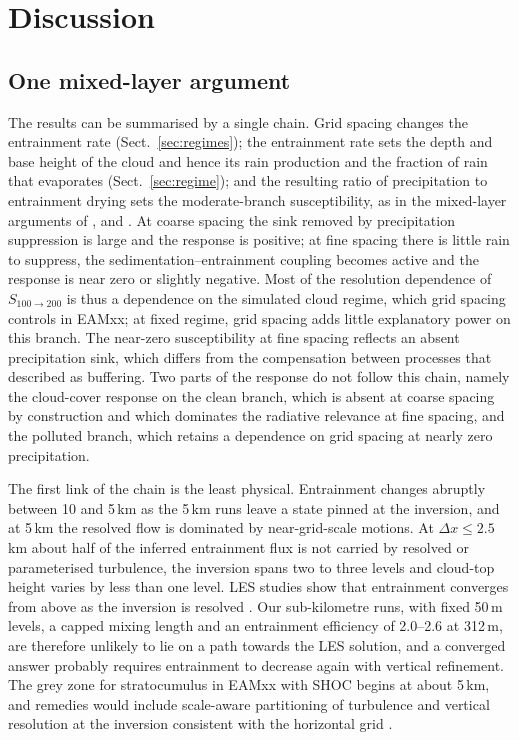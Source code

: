 \documentclass[acp, manuscript]{copernicus}
\newcommand{\dx}{\Delta x}
\newcommand{\Shigh}{S_{100\rightarrow200}}
\begin{document}
\section{Discussion}\label{sec:discussion}

\subsection{One mixed-layer argument}

The results can be summarised by a single chain. Grid spacing changes the entrainment rate (Sect.~\ref{sec:regimes}); the entrainment rate sets the depth and base height of the cloud and hence its rain production and the fraction of rain that evaporates (Sect.~\ref{sec:regime}); and the resulting ratio of precipitation to entrainment drying sets the moderate-branch susceptibility, as in the mixed-layer arguments of \citet{ackerman2004}, \citet{wood2007} and \citet{hoffmann2020}. At coarse spacing the sink removed by precipitation suppression is large and the response is positive; at fine spacing there is little rain to suppress, the sedimentation--entrainment coupling becomes active and the response is near zero or slightly negative. Most of the resolution dependence of $\Shigh$ is thus a dependence on the simulated cloud regime, which grid spacing controls in EAMxx; at fixed regime, grid spacing adds little explanatory power on this branch. The near-zero susceptibility at fine spacing reflects an absent precipitation sink, which differs from the compensation between processes that \citet{stevens2009} described as buffering. Two parts of the response do not follow this chain, namely the cloud-cover response on the clean branch, which is absent at coarse spacing by construction and which dominates the radiative relevance at fine spacing, and the polluted branch, which retains a dependence on grid spacing at nearly zero precipitation.

The first link of the chain is the least physical. Entrainment changes abruptly between 10 and 5\,km as the 5\,km runs leave a state pinned at the inversion, and at 5\,km the resolved flow is dominated by near-grid-scale motions. At $\dx\leq2.5$\,km about half of the inferred entrainment flux is not carried by resolved or parameterised turbulence, the inversion spans two to three levels and cloud-top height varies by less than one level. LES studies show that entrainment converges from above as the inversion is resolved \citep{stevens1999res,stevens2005,pressel2017,mellado2018}. Our sub-kilometre runs, with fixed 50\,m levels, a capped mixing length and an entrainment efficiency of 2.0--2.6 at 312\,m, are therefore unlikely to lie on a path towards the LES solution, and a converged answer probably requires entrainment to decrease again with vertical refinement. The grey zone for stratocumulus in EAMxx with SHOC begins at about 5\,km, and remedies would include scale-aware partitioning of turbulence \citep{boutle2014,efstathiou2015,honnert2011} and vertical resolution at the inversion consistent with the horizontal grid \citep{bogenschutz2023rrm}.
\end{document}
